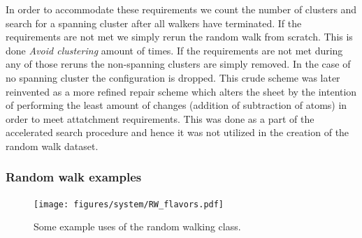 In order to accommodate these requirements we count the number of clusters and search for a spanning cluster after all walkers have terminated. If the requirements are not met we simply rerun the random walk from scratch. This is done \textit{Avoid clustering} amount of times. If the requirements are not met during any of those reruns the non-spanning clusters are simply removed. In the case of no spanning cluster the configuration is dropped. This crude scheme was later reinvented as a more refined repair scheme which alters the sheet by the intention of performing the least amount of changes (addition of subtraction of atoms) in order to meet attatchment requirements. This was done as a part of the accelerated search procedure and hence it was not utilized in the creation of the random walk dataset. 






\subsubsection{Random walk examples}

\begin{figure}[H]
  \centering
  \texttt{[image: figures/system/RW\_flavors.pdf]}
  \caption{Some example uses of the random walking class.}
  \label{fig:RW_flavors}
\end{figure}

